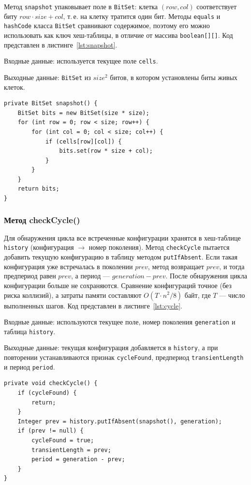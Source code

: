 \documentclass[a4paper,14pt]{extarticle}
\begin{document}
Метод \texttt{snapshot} упаковывает поле в \texttt{BitSet}: клетка $(row, col)$ соответствует биту $row \cdot size + col$, т.\,е. на клетку тратится один бит. Методы \texttt{equals} и \texttt{hashCode} класса \texttt{BitSet} сравнивают содержимое, поэтому его можно использовать как ключ хеш-таблицы, в отличие от массива \texttt{boolean[][]}. Код представлен в листинге~\ref{lst:snapshot}.

Входные данные: используется текущее поле \texttt{cells}.

Выходные данные: \texttt{BitSet} из $size^2$ битов, в котором установлены биты живых клеток.

\begin{lstlisting}[caption={Метод snapshot()}, label={lst:snapshot}]
private BitSet snapshot() {
	BitSet bits = new BitSet(size * size);
	for (int row = 0; row < size; row++) {
		for (int col = 0; col < size; col++) {
			if (cells[row][col]) {
				bits.set(row * size + col);
			}
		}
	}
	return bits;
}
\end{lstlisting}

\subsubsection*{Метод checkCycle()}

Для обнаружения цикла все встреченные конфигурации хранятся в хеш-таблице \texttt{history} (конфигурация $\to$ номер поколения). Метод \texttt{checkCycle} пытается добавить текущую конфигурацию в таблицу методом \texttt{putIfAbsent}. Если такая конфигурация уже встречалась в поколении $prev$, метод возвращает $prev$, и тогда предпериод равен $prev$, а период --- $generation - prev$. После обнаружения цикла конфигурации больше не сохраняются. Сравнение конфигураций точное (без риска коллизий), а затраты памяти составляют $O(T \cdot n^2 / 8)$ байт, где $T$ --- число выполненных шагов. Код представлен в листинге~\ref{lst:cycle}.

Входные данные: используются текущее поле, номер поколения \texttt{generation} и таблица \texttt{history}.

Выходные данные: текущая конфигурация добавляется в \texttt{history}, а при повторении устанавливаются признак \texttt{cycleFound}, предпериод \texttt{transientLength} и период \texttt{period}.

\begin{lstlisting}[caption={Метод checkCycle()}, label={lst:cycle}]
private void checkCycle() {
	if (cycleFound) {
		return;
	}
	Integer prev = history.putIfAbsent(snapshot(), generation);
	if (prev != null) {
		cycleFound = true;
		transientLength = prev;
		period = generation - prev;
	}
}
\end{lstlisting}
\end{document}
